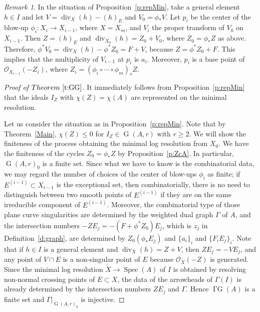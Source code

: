 \documentclass[12pt]{amsart}
\theoremstyle{definition}
\theoremstyle{remark}
\newtheorem{rem}[thm]{Remark}
\numberwithin{equation}{section}
\newcommand{\thmref}[1]{Theorem~\ref{#1}}
\newcommand{\proref}[1]{Proposition~\ref{#1}}
\newcommand{\defref}[1]{Definition~\ref{#1}}
\DeclareMathOperator{\spec}{Spec}
\DeclareMathOperator{\di}{div}
\DeclareMathOperator{\G}{G}
\DeclareMathOperator{\GG}{\Gamma G}
\newcommand{\cO}{\mathcal O}
\renewcommand{\:}{\colon}
\begin{document}
\begin{rem}\label{r:ai}
In the situation of \proref{p:repMin}, take a general element $h\in I$ and let $V=\di_X(h)-(h)_E$ and $V_0=\phi_*V$.
Let $p_i$ be the center of the blow-up $\phi_i\: X_i\to X_{i-1}$, where $X=X_m$, and $V_i$ the proper transform of $V_0$ on $X_{i-1}$.
 Then $Z=(h)_E$ and $\di_{X_0}(h)=Z_0+V_0$, where $Z_0= \phi_*Z$ as above.
Therefore, $\phi^*V_0=\di_X(h)-\phi^*Z_0=F+V$, because $Z=\phi^*Z_0+F$.
This implies that the multiplicity of $V_{i-1}$ at $p_i$ is $a_i$.
Moreover, $p_i$ is a base point of $\cO_{X_{i-1}}(-Z_i)$, where $Z_i = (\phi_i\circ \cdots \circ \phi_m)_*Z$.
\end{rem}

\begin{proof}[Proof of $\thmref{t:GG}$]
It immediately follows from \proref{p:repMin} that the ideals $I_Z$  with $\chi(Z)=\chi(A)$ are represented on the minimal resolution.
\par 
Let us consider the situation as in \proref{p:repMin}.
Note that by \thmref{Main}, $\chi(Z)\le 0$ for $I_Z \in \G(A,r)$ with $r\ge 2$.
We will show the finiteness of the process obtaining the minimal log resolution from $X_0$.
We have the finiteness of the cycles $Z_0=\phi_*Z$  by \proref{p:ZcA}.
In particular,  $\G(A,r)_0$ is a finite set.
Since what we have to know is the combinatorial data, we may regard the number of choices of the center of blow-ups $\phi_i$ as finite; 
 if $E^{(i-1)}\subset X_{i-1}$ is the exceptional set, then combinatorially, there is no need to distinguish between two smooth points of $E^{(i-1)}$ if they are on the same irreducible component of $E^{(i-1)}$. 
Moreover, the combinatorial type of  those plane curve singularities  are determined by the weighted dual graph $\Gamma$ of $A$, and the intersection numbers 
 $-ZE_j=-(F+\phi^*Z_0)E_j$, which is $z_j$ in \defref{d:graph},
  are determined by $Z_0(\phi_*E_j)$ and $\{a_i\}_i$ and $\{F_iE_j\}_i$. 
Note that if $h\in I$ is a general element and $\di_X(h)=Z+V$, then $ZE_j=-VE_j$, and any point of $V \cap E$ is a non-singular point of $E$ because $\cO_X(-Z)$ is generated.
Since the minimal log resolution $\tilde X \to \spec (A)$ of $I$ is obtained by resolving non-normal crossing points of $E \subset X$, the data of the arrowheads of $\Gamma(I)$ is already determined by the intersection numbers $ZE_j$ and $\Gamma$.
Hence $\GG(A)$ is a finite set  and $\Gamma |_{\G(A,r)_0}$ is injective. 
\end{proof}
\end{document}
